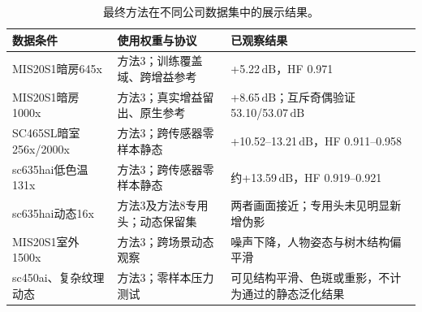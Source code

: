 \documentclass[11pt,a4paper,UTF8,fontset=fandol]{ctexart}
\newcommand{\db}{\ensuremath{\,\mathrm{dB}}}
\begin{document}
\begin{table}[H]
\centering\small
\caption{最终方法在不同公司数据集中的展示结果。}
\label{tab:result_scope}
\begin{tabular}{P{0.26\textwidth}P{0.23\textwidth}P{0.40\textwidth}}
\toprule
数据条件 & 使用权重与协议 & 已观察结果 \\
\midrule
MIS20S1暗房645x & 方法3；训练覆盖域、跨增益参考 & +5.22\db，HF 0.971 \\
MIS20S1暗房1000x & 方法3；真实增益留出、原生参考 & +8.65\db；互斥奇偶验证53.10/53.07\db \\
SC465SL暗室256x/2000x & 方法3；跨传感器零样本静态 & +10.52--13.21\db，HF 0.911--0.958 \\
sc635hai低色温131x & 方法3；跨传感器零样本静态 & 约+13.59\db，HF 0.919--0.921 \\
sc635hai动态16x & 方法3及方法8专用头；动态保留集 & 两者画面接近；专用头未见明显新增伪影 \\
MIS20S1室外1500x & 方法3；跨场景动态观察 & 噪声下降，人物姿态与树木结构偏平滑 \\
sc450ai、复杂纹理动态 & 方法3；零样本压力测试 & 可见结构平滑、色斑或重影，不计为通过的静态泛化结果 \\
\bottomrule
\end{tabular}
\end{table}

\clearpage
\end{document}
